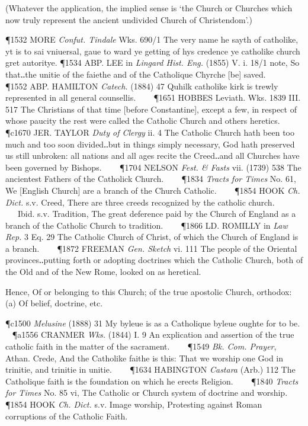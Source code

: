 \begin{description}[wide, labelwidth=!, labelindent=0pt]
\begin{myenumerate}
(Whatever the application, the implied sense is ‘the Church or Churches which now truly represent the ancient undivided Church of Christendom’.)

\P 1532 MORE  \textit{Confut. Tindale} Wks. 690/1 The very name he sayth of catholike, yt is to sai vniuersal, gaue to ward ye getting of hys credence ye catholike church gret autoritye.
\P 1534 ABP. LEE in \textit{Lingard Hist. Eng.} (1855) V. i. 18/1 note, So that‥the unitie of the faiethe and of the Catholique Chyrche [be] saved.    
\P 1552 ABP. HAMILTON  \textit{Catech.} (1884) 47 Quhilk catholike kirk is trewly represented in all general counsellis.    
\P 1651 HOBBES Leviath. Wks. 1839 III.  517 The Christians of that time [before Constantine], except a few, in respect of whose paucity the rest were called the Catholic Church and others heretics.
\P c1670 JER. TAYLOR  \textit{Duty of Clergy} ii. 4 The Catholic Church hath been too much and too soon divided‥but in things simply necessary, God hath preserved us still unbroken: all nations and all ages recite the Creed‥and all Churches have been governed by Bishops.    
\P 1704 NELSON  \textit{Fest. \& Fasts} vii. (1739) 538 The ancientest Fathers of the Catholick Church.    
\P 1834 \textit{Tracts  for Times} No. 61, We [English Church] are a branch of the Church Catholic.    
\P 1854 HOOK  \textit{Ch. Dict.} s.v. Creed, There are three creeds recognized by the catholic church.    Ibid. s.v. Tradition, The great deference paid by the Church of England as a branch of the Catholic Church to tradition.    
\P 1866 LD. ROMILLY in \textit{Law Rep.} 3 Eq. 29 The Catholic Church of Christ, of which the Church of England is a branch.    
\P 1872 FREEMAN  \textit{Gen. Sketch} vi. 111 The people of the Oriental provinces‥putting forth or adopting doctrines which the Catholic Church, both of the Old and of the New Rome, looked on as heretical.

 Hence, Of or belonging to this Church; of the true apostolic Church, orthodox: (a) Of belief, doctrine, etc.

\P c1500 \textit{Melusine}  (1888) 31 My byleue is as a Catholique byleue oughte for to be.  
\P a1556 CRANMER  \textit{Wks.} (1844) I. 9 An explication and assertion of the true catholic faith in the matter of the sacrament.    
\P 1549 \textit{Bk. Com.  Prayer}, Athan. Crede, And the Catholike faithe is this: That we worship one God in trinitie, and trinitie in unitie.    
\P 1634 HABINGTON  \textit{Castara} (Arb.) 112 The Catholique faith is the foundation on which he erects Religion.    
\P 1840 \textit{Tracts  for Times} No. 85 vi, The Catholic or Church system of doctrine and worship.    
\P 1854 HOOK  \textit{Ch. Dict.} s.v. Image worship, Protesting against Roman corruptions of the Catholic Faith.


\end{myenumerate}
\end{description}
